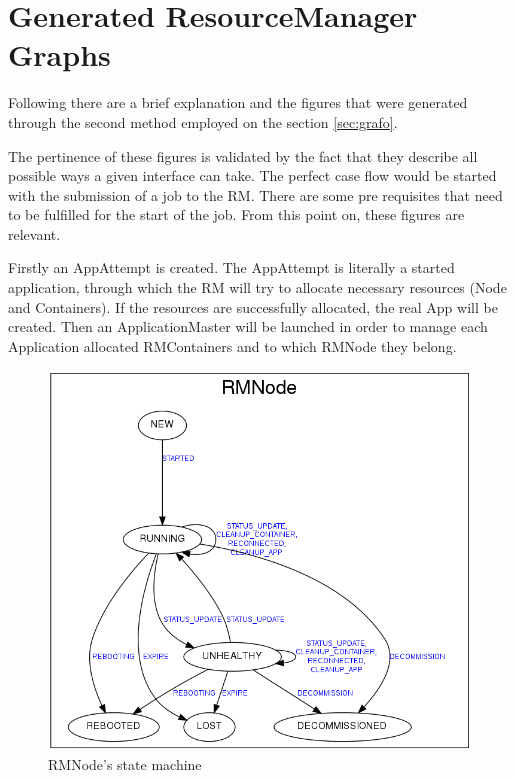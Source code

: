 \renewcommand{\appendixsname}{Appendix}
\chapter{Generated ResourceManager Graphs}
\label{chap:ApendA}

Following there are a brief explanation and the figures that were generated through the second method employed on the section \ref{sec:grafo}.

The pertinence of these figures is validated by the fact that they describe all possible ways a given interface can take. The perfect case flow would be started with the submission of a job to the RM. There are some pre requisites that need to be fulfilled for the start of the job. From this point on, these figures are relevant.

Firstly an AppAttempt is created. The AppAttempt is literally a started application, through which the RM will try to allocate necessary resources (Node and Containers). If the resources are successfully allocated, the real App will be created. Then an ApplicationMaster will be launched in order to manage each Application allocated RMContainers and to which RMNode they belong.

\begin{figure}[hbtn]
   \centering
   \renewcommand{\figurename}{Figure}
   \includegraphics[width=12cm]{figuras/Figura05-RMNode.png}
   \caption{RMNode's state machine}
   \label{fig:RMNode}
\end{figure}

